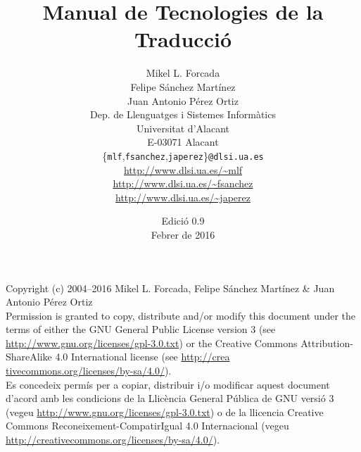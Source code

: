 \documentclass[11pt,a4paper]{book}
\begin{document}
\frontmatter


\title{\bf Manual de Tecnologies de la Traducció}

\author{Mikel L. Forcada\\Felipe Sánchez Martínez\\Juan Antonio Pérez Ortiz\\[2ex]
Dep. de Llenguatges i Sistemes Informàtics\\
Universitat d'Alacant\\
E-03071 Alacant\\[2ex]
\{\texttt{mlf},\texttt{fsanchez},\texttt{japerez}\}\texttt{@dlsi.ua.es} \\[2ex]
\url{http://www.dlsi.ua.es/~mlf} \\
\url{http://www.dlsi.ua.es/~fsanchez} \\
\url{http://www.dlsi.ua.es/~japerez}
}
\date{Edició 0.9\\ Febrer de 2016}
\maketitle
\newpage
\noindent Copyright (c) 2004--2016 Mikel L. Forcada, Felipe Sánchez Martínez \& Juan Antonio Pérez Ortiz \\[0.3cm]

\noindent Permission is granted to copy, distribute and/or modify this
document under the terms of either the GNU General Public License
version 3 (see \url{http://www.gnu.org/licenses/gpl-3.0.txt}) or the
Creative Commons Attribution-ShareAlike 4.0 International
license (see \url{http://crea} \url{tivecommons.org/licenses/by-sa/4.0/}). \\[0.3cm]

\noindent Es concedeix permís per a copiar, distribuir i/o modificar
aquest document d'acord amb les condicions de la Llicència General
Pública de GNU versió 3 (vegeu
\url{http://www.gnu.org/licenses/gpl-3.0.txt}) o de la llicencia
Creative Commons Reconeixement-CompatirIgual 4.0 Internacional (vegeu
\url{http://creativecommons.org/licenses/by-sa/4.0/}).


\maketitle

\tableofcontents
\newpage
\end{document}
